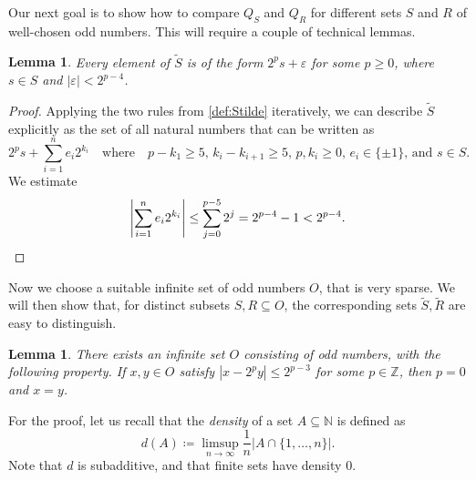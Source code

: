\documentclass[reqno,12pt]{amsart}\setcounter{tocdepth}{1}
\newtheorem{lemma}[theorem]{Lemma}
\theoremstyle{definition}
\newcommand{\N}{\mathbb{N}}
\newcommand{\Z}{\mathbb{Z}}
\numberwithin{equation}{section}
\begin{document}
Our next goal is to show how to compare $Q_S$ and $Q_R$ for different sets $S$ and $R$ of well-chosen odd numbers. This will require a couple of technical lemmas.

\begin{lemma}
\label{lem:Stilde:estimate}
    Every element of $\widetilde{S}$ is of the form $2^p s + \varepsilon$ for some $p \geq 0$, where $s \in S$ and $|\varepsilon| < 2^{p-4}$.
\end{lemma}

\begin{proof}
    Applying the two rules from \cref{def:Stilde} iteratively, we can describe $\widetilde{S}$ explicitly as the set of all natural numbers that can be written as
    \[2^p s + \sum\limits_{i = 1}^n e_i 2^{k_i}  \quad \text{where} \quad p - k_1 \geq 5\text{, } k_i - k_{i+1} \geq 5\text{, } p, k_i \geq 0\text{, } e_i \in \{ \pm 1 \}\text{, and } s \in S.\]
    We estimate
    \[\left| \sum\limits_{i = 1}^n e_i 2^{k_i} \right| \leq \sum\limits_{j = 0}^{p-5} 2^j = 2^{p-4} - 1 < 2^{p-4}.\qedhere\]
\end{proof}

Now we choose a suitable infinite set of odd numbers $O$, that is very sparse. We will then show that, for distinct subsets $S, R \subseteq O$, the corresponding sets $\widetilde{S}, \widetilde{R}$ are easy to distinguish.

\begin{lemma}
\label{lem:goododdnumbers}
    There exists an infinite set $O$ consisting of odd numbers, with the following property. If $x, y \in O$ satisfy $|x - 2^p y| \leq 2^{p-3}$ for some $p \in \Z$, then $p = 0$ and $x = y$.
\end{lemma}

For the proof, let us recall that the \emph{density} of a set $A \subseteq \N$ is defined as 
\[
d(A) \coloneqq \limsup\limits_{n \to \infty} \frac{1}{n} \bigg|A \cap \{1, \ldots, n \}\bigg|.
\]
Note that $d$ is subadditive, and that finite sets have density $0$.
\end{document}
